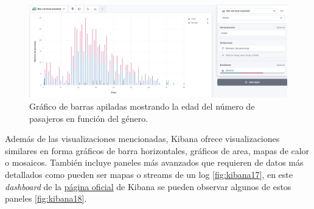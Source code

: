 \begin{figure}
    \centering
    \includegraphics[width=1\linewidth]{img/kibana16.png}
    \caption{Gráfico de barras apiladas mostrando la edad del número de pasajeros en función del género.}
    \label{fig:kibana16}
\end{figure}

Además de las visualizaciones mencionadas, Kibana ofrece visualizaciones similares en forma gráficos de barra horizontales, gráficos de area, mapas de calor o mosaicos. También incluye paneles más avanzados que requieren de datos más detallados como pueden ser mapas o streams de un log \ref{fig:kibana17}, en este \textit{dashboard} de la \href{https://www.elastic.co/es/blog/kibana-3-0-0-ga-now-available}{página oficial} de Kibana se pueden observar algunos de estos paneles \ref{fig:kibana18}.

